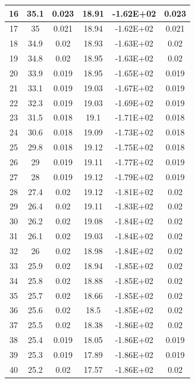 \documentclass{THUexprep}
\begin{document}
\begin{longtable}{|c|c|c|c|c|c|}
    \hline
    16    & 35.1  & 0.023 & 18.91 & -1.62E+02 & 0.023 \\
    \hline
    17    & 35    & 0.021 & 18.94 & -1.62E+02 & 0.021 \\
    \hline
    18    & 34.9  & 0.02  & 18.93 & -1.63E+02 & 0.02 \\
    \hline
    19    & 34.8  & 0.02  & 18.95 & -1.63E+02 & 0.02 \\
    \hline
    20    & 33.9  & 0.019 & 18.95 & -1.65E+02 & 0.019 \\
    \hline
    21    & 33.1  & 0.019 & 19.03 & -1.67E+02 & 0.019 \\
    \hline
    22    & 32.3  & 0.019 & 19.03 & -1.69E+02 & 0.019 \\
    \hline
    23    & 31.5  & 0.018 & 19.1  & -1.71E+02 & 0.018 \\
    \hline
    24    & 30.6  & 0.018 & 19.09 & -1.73E+02 & 0.018 \\
    \hline
    25    & 29.8  & 0.018 & 19.12 & -1.75E+02 & 0.018 \\
    \hline
    26    & 29    & 0.019 & 19.11 & -1.77E+02 & 0.019 \\
    \hline
    27    & 28    & 0.019 & 19.12 & -1.79E+02 & 0.019 \\
    \hline
    28    & 27.4  & 0.02  & 19.12 & -1.81E+02 & 0.02 \\
    \hline
    29    & 26.4  & 0.02  & 19.11 & -1.83E+02 & 0.02 \\
    \hline
    30    & 26.2  & 0.02  & 19.08 & -1.84E+02 & 0.02 \\
    \hline
    31    & 26.1  & 0.02  & 19.03 & -1.84E+02 & 0.02 \\
    \hline
    32    & 26    & 0.02  & 18.98 & -1.84E+02 & 0.02 \\
    \hline
    33    & 25.9  & 0.02  & 18.94 & -1.85E+02 & 0.02 \\
    \hline
    34    & 25.8  & 0.02  & 18.88 & -1.85E+02 & 0.02 \\
    \hline
    35    & 25.7  & 0.02  & 18.66 & -1.85E+02 & 0.02 \\
    \hline
    36    & 25.6  & 0.02  & 18.5  & -1.85E+02 & 0.02 \\
    \hline
    37    & 25.5  & 0.02  & 18.38 & -1.86E+02 & 0.02 \\
    \hline
    38    & 25.4  & 0.019 & 18.05 & -1.86E+02 & 0.019 \\
    \hline
    39    & 25.3  & 0.019 & 17.89 & -1.86E+02 & 0.019 \\
    \hline
    40    & 25.2  & 0.02  & 17.57 & -1.86E+02 & 0.02 \\

\end{longtable}
\end{document}
